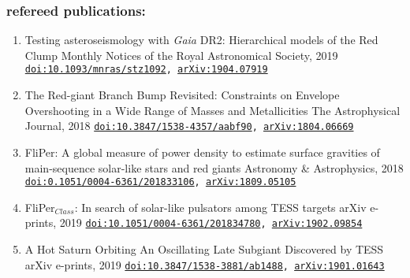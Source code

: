 \documentclass[]{k-cv} %
\begin{document}
\subsubsection*{\color{c2}refereed publications:}
\vspace{-0.2cm}
\begin{enumerate}
	\item {}
	{Testing asteroseismology with \textit{Gaia} DR2: Hierarchical models of the Red Clump}
	{Monthly Notices of the Royal Astronomical Society, 2019}
	{\texttt{\href{https://academic.oup.com/mnras/article-abstract/486/3/3569/5475128}{doi:10.1093/mnras/stz1092}, \href{https://arxiv.org/abs/1904.07919}{arXiv:1904.07919}}}
	
	\item {}
	{The Red-giant Branch Bump Revisited: Constraints on Envelope Overshooting in a Wide Range of Masses and Metallicities}
	{The Astrophysical Journal, 2018}
	{\texttt{\href{https://iopscience.iop.org/article/10.3847/1538-4357/aabf90}{doi:10.3847/1538-4357/aabf90}, \href{https://arxiv.org/abs/1804.06669}{arXiv:1804.06669}}}
	
	\item {}
	{FliPer: A global measure of power density to estimate surface gravities of main-sequence solar-like stars and red giants}
	{Astronomy \& Astrophysics, 2018}
	{\texttt{\href{https://www.aanda.org/articles/aa/abs/2018/12/aa33106-18/aa33106-18.html}{doi:0.1051/0004-6361/201833106}, \href{https://arxiv.org/abs/1809.05105}{arXiv:1809.05105}}}
	
	\item {}
	{FliPer$_{Class}$: In search of solar-like pulsators among TESS targets}
	{arXiv e-prints, 2019}
	{\texttt{\href{https://www.aanda.org/articles/aa/abs/2019/04/aa34780-18/aa34780-18.html}{doi:10.1051/0004-6361/201834780}, \href{https://arxiv.org/abs/1902.09854}{arXiv:1902.09854}}}
	
	\item {}
	{{A Hot Saturn Orbiting An Oscillating Late Subgiant Discovered by TESS}}
	{arXiv e-prints, 2019}
	{\texttt{\href{https://iopscience.iop.org/article/10.3847/1538-3881/ab1488}{doi:10.3847/1538-3881/ab1488}, \href{https://arxiv.org/abs/1901.01643}{arXiv:1901.01643}}}
	

\end{enumerate}
\end{document}
